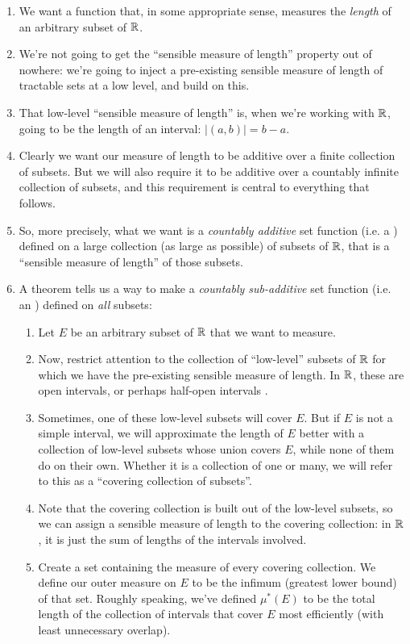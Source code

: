 \begin{enumerate}

\item We want a function that, in some appropriate sense, measures the {\it length} of an arbitrary subset of
  $\mathbb{R}$.

\item We're not going to get the ``sensible measure of length​'' property out of nowhere: we're going to inject a
  pre-existing sensible measure of length of tractable sets at a low level, and build on this.

\item That low-level ``sensible measure of length​'' is, when we're working with $\mathbb{R}$, going to be the length of an
  interval: $|(a, b)| = b - a$.

\item Clearly we want our measure of length to be additive over a finite collection of subsets. But we will also
  require it to be additive over a countably infinite collection of subsets, and this requirement is central to
  everything that follows.

\item So, more precisely, what we want is a {\it countably additive} set function (i.e. a ) defined on a large collection (as
  large as possible) of subsets of $\mathbb{R}$, that is a ``sensible measure of length​'' of those subsets.

\item A theorem tells us a way to make a {\it countably sub-additive} set function (i.e. an ) defined on {\it all} subsets:
  \begin{enumerate}
  \item Let $E$ be an arbitrary subset of $\mathbb{R}$ that we want to measure.
  \item Now, restrict attention to the collection of ``low-level​'' subsets of $\mathbb{R}$ for which we have the pre-existing
    sensible measure of length. In $\mathbb{R}$, these are open intervals, or perhaps half-open intervals .
  \item Sometimes, one of these low-level subsets will cover $E$. But if $E$ is not a simple interval, we will
    approximate the length of $E$ better with a collection of low-level subsets whose union covers $E$, while
    none of them do on their own. Whether it is a collection of one or many, we will refer to this as a
    ``covering collection of subsets​''.
  \item Note that the covering collection is built out of the low-level subsets, so we can assign a sensible
    measure of length to the covering collection: in $\mathbb{R}$, it is just the sum of lengths of the intervals involved.
  \item Create a set containing the measure of every covering collection. We define our outer measure on $E$ to be
    the infimum (greatest lower bound) of that set. Roughly speaking, we've defined $\mu^*(E)$ to be the total
    length of the collection of intervals that cover $E$ most efficiently (with least unnecessary overlap).
  \end{enumerate}


\end{enumerate}
